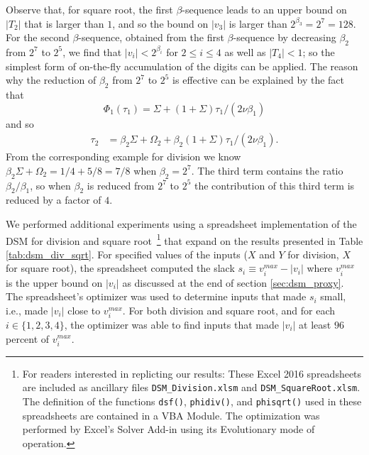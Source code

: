 \documentclass[10pt]{article}
\theoremstyle{definition}
\theoremstyle{remark}
\numberwithin{equation}{section}
\newcommand{\abs}[1]{\lvert #1 \rvert}
\begin{document}
Observe that, for square root, the first $\beta$-sequence leads to an upper bound on $\abs{T_2}$ that is larger than $1$, and so the bound on $\abs{v_3}$ is larger than $2^{\beta_3} = 2^7 = 128$. 
For the second $\beta$-sequence, obtained from the first $\beta$-sequence by decreasing $\beta_2$ from $2^7$ to $2^5$, we find that $\abs{v_i} < 2^{\beta_i}$ for $2 \le i \le 4$ as well as $\abs{T_4} < 1$; so the simplest form of on-the-fly accumulation of the digits can be applied. 
The reason why the reduction of $\beta_2$ from $2^7$ to $2^5$ is effective can be explained by the fact that
\[
\Phi_1(\tau_1) = \Sigma + (1+\Sigma)\tau_1/(2\nu\beta_1)
\]
and so
\begin{align*}
\tau_2  &= \beta_2\Sigma + \Omega_2 + \beta_2(1+\Sigma)\tau_1/(2\nu\beta_1) .
\end{align*}
From the corresponding example for division we know $\beta_2 \Sigma + \Omega_2 = 1/4 + 5/8 = 7/8$ when $\beta_2 = 2^7$.
The third term contains the ratio $\beta_2/\beta_1$, so when $\beta_2$ is reduced from $2^7$ to $2^5$ the contribution of this third term is reduced by a factor of $4$. 

We performed additional experiments using a spreadsheet implementation of the DSM for division and square root~\footnote{For readers interested in replicting our results: These Excel 2016 spreadsheets are included as ancillary files {\tt DSM\_Division.xlsm} and {\tt DSM\_SquareRoot.xlsm}. The definition of the functions {\tt dsf()}, {\tt phidiv()}, and {\tt phisqrt()} used in these spreadsheets are contained in a VBA Module. The optimization was performed by Excel's Solver Add-in using its Evolutionary mode of operation.} that expand on the results presented in Table \ref{tab:dsm_div_sqrt}. 
For specified values of the inputs ($X$ and $Y$ for division, $X$ for square root), the spreadsheet computed the slack $s_i \equiv v^{max}_i - \abs{v_i}$ where $v^{max}_i$ is the upper bound on $\abs{v_i}$ as discussed at the end of section \ref{sec:dsm_proxy}.
The spreadsheet's optimizer was used to determine inputs that made $s_i$ small, i.e., made $\abs{v_i}$ close to $v^{max}_i$. 
For both division and square root, and for each $i \in \{1,2,3,4\}$, the optimizer was able to find inputs that made $\abs{v_i}$ at least $96$ percent of $v^{max}_i$.
\end{document}
